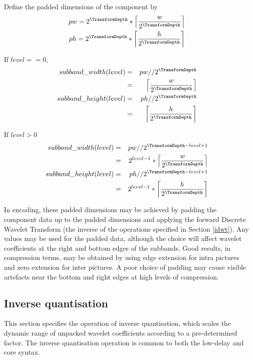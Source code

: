 Define the padded dimensions of the component by
\begin{eqnarray*}
pw = 2^{\TransformDepth}*\left\lceil\frac{w}{2^{\TransformDepth}}\right\rceil\\ 
ph = 2^{\TransformDepth}*\left\lceil\frac{h}{2^{\TransformDepth}}\right\rceil
\end{eqnarray*}

If $level==0$,
\begin{eqnarray*}
subband\_width(level) & = & pw//2^{\TransformDepth} \\
& = & \left\lceil\frac{w}{2^{\TransformDepth}}\right\rceil \\
subband\_height(level) & = & ph//2^{\TransformDepth} \\
& = & \left\lceil\frac{h}{2^{\TransformDepth}}\right\rceil
\end{eqnarray*}

If $level>0$
\begin{eqnarray*}
subband\_width(level) & = & pw//2^{\TransformDepth-level+1} \\
& = & 2^{level-1}*\left\lceil \frac{w}{2^{\TransformDepth}}\right\rceil \\
subband\_height(level) & = & ph//2^{\TransformDepth-level+1} \\
& = & 2^{level-1}*\left\lceil\frac{h}{2^{\TransformDepth}}\right\rceil
\end{eqnarray*}

\begin{informative}
In encoding, these padded dimensions may be achieved by padding the 
component data up to the padded dimensions and applying the forward
Discrete Wavelet Transform (the inverse of the operations specified in
Section \ref{idwt}). Any values may be used for the padded data, although
the choice will affect wavelet coefficients at the right and bottom 
edges of the subbands. Good results, in compression terms, may be obtained
 by using edge extension for intra pictures and zero extension for inter 
pictures. A poor choice of padding may cause visible artefacts near the
bottom and right edges at high levels of compression.
\end{informative}

\subsection{Inverse quantisation}
\label{invquant}

This section specifies the operation of inverse quantisation, which scales the
dynamic range of unpacked wavelet coefficients according to a pre-determined factor.
The inverse quantisation operation is common to both the low-delay and core syntax.

